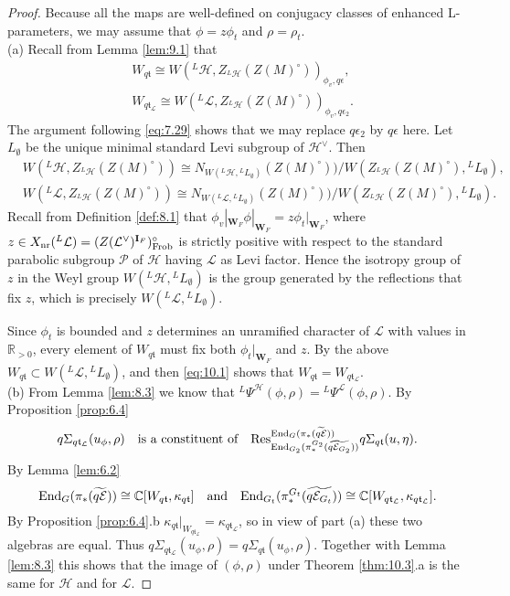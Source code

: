 \documentclass[11pt]{amsart}
\theoremstyle{definition}
\newcommand{\mb}{\mathbf}
\newcommand{\mc}{\mathcal}
\newcommand{\R}{\mathbb R}
\newcommand{\C}{\mathbb C}
\def\End{{\rm End}}
\def\cL{{\mathcal L}}
\def\cH{{\mathcal H}}
\def\cE{{\mathcal E}}
\def\Fr{{\rm Frob}}
\def\nr{{\rm nr}}
\def\ft{{\mathfrak t}}
\def\Res{{\rm Res}}
\begin{document}
\begin{proof}
Because all the maps are well-defined on conjugacy classes of enhanced L-parameters,
we may assume that $\phi = z \phi_t$ and $\rho = \rho_t$.\\
(a) Recall from Lemma \ref{lem:9.1} that
\begin{equation}\label{eq:10.1}
\begin{split}
& W_{q \ft} \cong W({}^L \cH,Z_{{}^L \cH}(Z(M)^\circ))_{\phi_v,q \epsilon} , \\
& W_{q \ft_\cL} \cong W({}^L \cL,Z_{{}^L \cH}(Z(M)^\circ))_{\phi_v,q \epsilon_2} . 
\end{split}
\end{equation}
The argument following \eqref{eq:7.29} shows that we may replace $q \epsilon_2$
by $q \epsilon$ here.
Let $L_\emptyset$ be the unique minimal standard Levi subgroup of $\cH^\vee$. Then
\begin{align*}
& W({}^L \cH,Z_{{}^L \cH}(Z(M)^\circ)) \cong N_{W({}^L \cH,{}^L L_\emptyset)} (Z(M)^\circ))
/ W(Z_{{}^L \cH}(Z(M)^\circ), {}^L L_\emptyset) ,\\
& W({}^L \cL,Z_{{}^L \cH}(Z(M)^\circ)) \cong N_{W({}^L \cL,{}^L L_\emptyset)} (Z(M)^\circ))
/ W(Z_{{}^L \cH}(Z(M)^\circ), {}^L L_\emptyset) .
\end{align*}
Recall from Definition \ref{def:8.1} that $\phi_v |_{\mb W_F} \phi |_{\mb W_F} = 
z \phi_t |_{\mb W_F}$, where $z \in X_\nr ({}^L \cL) = (Z (\cL^\vee)^{\mb I_F} )^\circ_\Fr$ 
is strictly positive with respect to the standard parabolic subgroup $\mc P$ of $\cH$ 
having $\cL$ as Levi factor. Hence the isotropy group of $z$ in the Weyl group 
$W({}^L \cH,{}^L L_\emptyset)$ is the group generated by the reflections that fix $z$, 
which is precisely $W({}^L \cL, {}^L L_\emptyset)$. 

Since $\phi_t$ is bounded and $z$ determines an unramified character of $\cL$ with 
values in $\R_{>0}$, every element of $W_{q \ft}$ must fix both $\phi_t |_{\mb W_F}$ 
and $z$. By the above $W_{q \ft} \subset W({}^L \cL, {}^L L_\emptyset)$, and then
\eqref{eq:10.1} shows that $W_{q \ft} = W_{q \ft_\cL}$.\\
(b) From Lemma \ref{lem:8.3} we know that ${}^L \Psi^\cH (\phi,\rho) = {}^L \Psi^\cL 
(\phi,\rho)$. By Proposition \ref{prop:6.4} 
\[
q \Sigma_{q \ft_\cL}(u_\phi,\rho) \quad \text{is a constituent of} \quad
\Res_{\End_{G_2} (\pi_*^{G_2} (\widetilde{q \cE_{G_2}}))}^{
\End_G (\pi_* (\widetilde{q \cE}))} q \Sigma_{q \ft}(u,\eta) .
\]
By Lemma \ref{lem:6.2} 
\[
\End_G (\pi_* (\widetilde{q \cE})) \cong \C [W_{q \ft}, \kappa_{q \ft}] 
\quad \text{and} \quad \End_{G_t} (\pi_*^{G_t} (\widetilde{q \cE_{G_t}})) 
\cong \C [W_{q \ft_\cL}, \kappa_{q \ft_\cL}] .
\]
By Proposition \ref{prop:6.4}.b $\kappa_{q \ft} |_{W_{q \ft_\cL}} = \kappa_{q \ft_\cL}$,
so in view of part (a) these two algebras are equal. Thus
$q \Sigma_{q \ft_\cL}(u_\phi,\rho) = q \Sigma_{q \ft}(u_\phi,\rho)$. Together with
Lemma \ref{lem:8.3} this shows that the image of $(\phi,\rho)$ under Theorem 
\ref{thm:10.3}.a is the same for $\cH$ and for $\cL$.


\end{proof}
\end{document}
